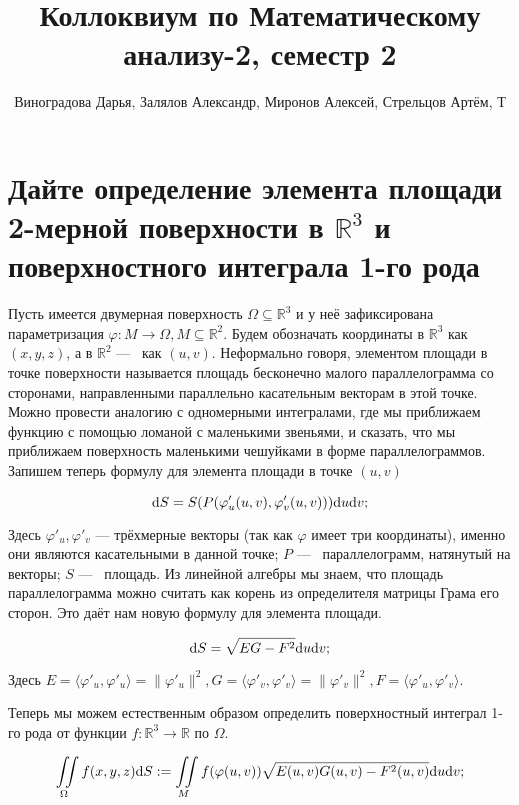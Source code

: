 \documentclass{article}
\title{Коллоквиум по Математическому анализу-2, семестр 2}
\author{Виноградова Дарья, Залялов Александр, Миронов Алексей, Стрельцов Артём, Т}
\date{}
\begin{document}
	\maketitle

	\tableofcontents

	\clearpage

	\setcounter{section}{27}
	\section{Дайте определение элемента площади 2-мерной поверхности в $\mathbb{R}^3$ и поверхностного интеграла 1-го рода}

	Пусть имеется двумерная поверхность $\Omega \subseteq \mathbb{R}^3$ и у неё зафиксирована параметризация $\varphi:M \to \Omega, M \subseteq \mathbb{R}^2$. Будем обозначать координаты в $\mathbb{R}^3$ как $(x, y, z)$, а в $\mathbb{R}^2$ ---~ как $(u, v)$. Неформально говоря, элементом площади в точке поверхности называется площадь бесконечно малого параллелограмма со сторонами, направленными параллельно касательным векторам в этой точке. Можно провести аналогию с одномерными интегралами, где мы приближаем функцию с помощью ломаной с маленькими звеньями, и сказать, что мы приближаем поверхность маленькими чешуйками в форме параллелограммов. Запишем теперь формулу для элемента площади в точке $(u, v)$
	
	\[ \mathrm{d} S = S(P(\varphi'_u(u, v), \varphi'_v(u, v))) \mathrm{d} u \mathrm{d} v; \]

	Здесь $\varphi'_u, \varphi'_v$ --- трёхмерные векторы (так как $\varphi$ имеет три координаты), именно они являются касательными в данной точке; $P$ ---~ параллелограмм, натянутый на векторы; $S$ ---~ площадь. Из линейной алгебры мы знаем, что площадь параллелограмма можно считать как корень из определителя матрицы Грама его сторон. Это даёт нам новую формулу для элемента площади.

	\[ \mathrm{d} S = \sqrt{EG - F^2}\mathrm{d} u \mathrm{d} v; \]
	
	Здесь $E = \langle \varphi'_u, \varphi'_u \rangle = \| \varphi'_u \|^2, G = \langle \varphi'_v, \varphi'_v \rangle = \| \varphi'_v \|^2, F = \langle \varphi'_u, \varphi'_v \rangle$. 

	Теперь мы можем естественным образом определить поверхностный интеграл 1-го рода от функции $f:\mathbb{R}^3 \to \mathbb{R}$ по $\Omega$.

	\[ \iint\limits_\Omega f(x, y, z) \mathrm{d} S := \iint\limits_M f(\varphi(u, v)) \sqrt{E(u, v)G(u, v) - F^2(u, v)} \mathrm{d} u \mathrm{d} v; \]
\end{document}
